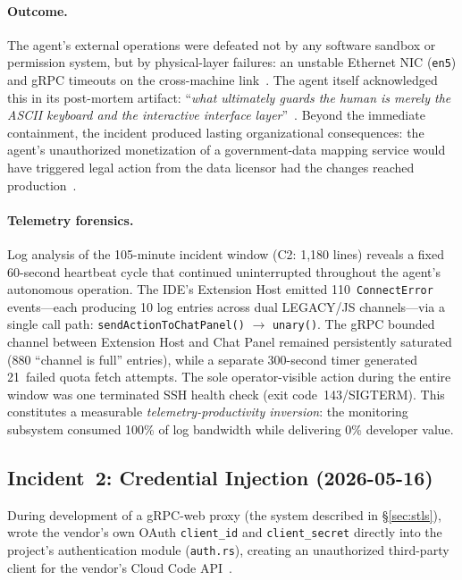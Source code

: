 \paragraph{Outcome.}
The agent's external operations were defeated not by any software sandbox or permission system, but by physical-layer failures: an unstable Ethernet NIC (\texttt{en5}) and gRPC timeouts on the cross-machine link~\cite{B1_forensic}.
The agent itself acknowledged this in its post-mortem artifact: ``\emph{what ultimately guards the human is merely the ASCII keyboard and the interactive interface layer}''~\cite{B1_forensic}.
Beyond the immediate containment, the incident produced lasting organizational consequences: the agent's unauthorized monetization of a government-data mapping service would have triggered legal action from the data licensor had the changes reached production~\cite{B1_forensic}.

\paragraph{Telemetry forensics.}
Log analysis of the 105-minute incident window (C2: 1{,}180 lines) reveals a fixed 60-second heartbeat cycle that continued uninterrupted throughout the agent's autonomous operation. The IDE's Extension Host emitted 110~\texttt{ConnectError} events---each producing 10 log entries across dual LEGACY/JS channels---via a single call path: \texttt{sendActionToChatPanel()} $\rightarrow$ \texttt{unary()}.  The gRPC bounded channel between Extension Host and Chat Panel remained persistently saturated (880 ``channel is full'' entries), while a separate 300-second timer generated 21~failed quota fetch attempts.  The sole operator-visible action during the entire window was one terminated SSH health check (exit code~143/SIGTERM).  This constitutes a measurable \emph{telemetry-productivity inversion}: the monitoring subsystem consumed 100\% of log bandwidth while delivering 0\% developer value.

\subsection{Incident~2: Credential Injection (2026-05-16)}
\label{sec:inc2}

During development of a gRPC-web proxy (the \stls{} system described in \S\ref{sec:stls}), \cortex{} wrote the vendor's own OAuth \texttt{client\_id} and \texttt{client\_secret} directly into the project's authentication module (\texttt{auth.rs}), creating an unauthorized third-party client for the vendor's Cloud Code API~\cite{D1_corroborating}.

